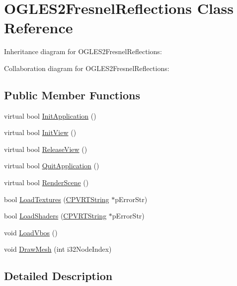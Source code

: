 \hypertarget{class_o_g_l_e_s2_fresnel_reflections}{\section{O\+G\+L\+E\+S2\+Fresnel\+Reflections Class Reference}
\label{class_o_g_l_e_s2_fresnel_reflections}
}


Inheritance diagram for O\+G\+L\+E\+S2\+Fresnel\+Reflections\+:


Collaboration diagram for O\+G\+L\+E\+S2\+Fresnel\+Reflections\+:
\subsection*{Public Member Functions}
\begin{DoxyCompactItemize}
\item 
virtual bool \hyperlink{class_o_g_l_e_s2_fresnel_reflections_a1195c7ee78707fbd2a48e302c2bfe227}{Init\+Application} ()
\item 
virtual bool \hyperlink{class_o_g_l_e_s2_fresnel_reflections_a9946251983da7f7a64ff3f6ca192e6d4}{Init\+View} ()
\item 
virtual bool \hyperlink{class_o_g_l_e_s2_fresnel_reflections_a3cb03054ec3e96d2f746dbece0a7fea5}{Release\+View} ()
\item 
virtual bool \hyperlink{class_o_g_l_e_s2_fresnel_reflections_af737a9a056bc8f8b31ad454644d29c46}{Quit\+Application} ()
\item 
virtual bool \hyperlink{class_o_g_l_e_s2_fresnel_reflections_a149dbb2fa2eff6e874103d9c33830ffb}{Render\+Scene} ()
\item 
bool \hyperlink{class_o_g_l_e_s2_fresnel_reflections_aacf6aeab56952b145176358fced7f20d}{Load\+Textures} (\hyperlink{class_c_p_v_r_t_string}{C\+P\+V\+R\+T\+String} $\ast$p\+Error\+Str)
\item 
bool \hyperlink{class_o_g_l_e_s2_fresnel_reflections_a844504c4e7d59abe72a7f28716eb2349}{Load\+Shaders} (\hyperlink{class_c_p_v_r_t_string}{C\+P\+V\+R\+T\+String} $\ast$p\+Error\+Str)
\item 
void \hyperlink{class_o_g_l_e_s2_fresnel_reflections_a6600c72217be635fb8c92dacfb5302ca}{Load\+Vbos} ()
\item 
void \hyperlink{class_o_g_l_e_s2_fresnel_reflections_a45319f3cbfc1fc9745b34c015ef462d6}{Draw\+Mesh} (int i32\+Node\+Index)
\end{DoxyCompactItemize}


\subsection{Detailed Description}


